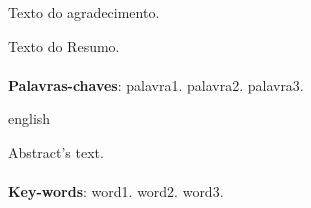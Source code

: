 \documentclass[12pt,oneside,a4paper, chapter=TITLE, section = TITLE, english, brazil]{abntex2}
\begin{document}
\begin{agradecimentos}
\begin{flushleft}
	Texto do agradecimento.
\end{flushleft}
\newpage
\end{agradecimentos}


\begin{resumo}
\setlength{\absparsep}{18pt} %

Texto do Resumo.
\\
\\
\textbf{Palavras-chaves}: palavra1. palavra2. palavra3.
\newpage
\end{resumo}


\begin{resumo}[Abstract]
\begin{otherlanguage*}{english}

Abstract's text.
\\
\\ 
\textbf{Key-words}: word1. word2. word3.
\end{otherlanguage*}
\end{resumo}


\listoffigures*
\cleardoublepage


\end{document}
